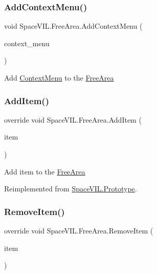 \subsubsection{\texorpdfstring{Add\+Context\+Menu()}{AddContextMenu()}}
{\footnotesize\ttfamily void Space\+V\+I\+L.\+Free\+Area.\+Add\+Context\+Menu (\begin{DoxyParamCaption}\item[{\mbox{\hyperlink{class_space_v_i_l_1_1_context_menu}{Context\+Menu}}}]{context\+\_\+menu }\end{DoxyParamCaption})}



Add \mbox{\hyperlink{class_space_v_i_l_1_1_context_menu}{Context\+Menu}} to the \mbox{\hyperlink{class_space_v_i_l_1_1_free_area}{Free\+Area}} 

\mbox{\label{class_space_v_i_l_1_1_free_area_a9145cbd1711d975fee90fde3187c1aff}} 
\subsubsection{\texorpdfstring{Add\+Item()}{AddItem()}}
{\footnotesize\ttfamily override void Space\+V\+I\+L.\+Free\+Area.\+Add\+Item (\begin{DoxyParamCaption}\item[{\mbox{\hyperlink{interface_space_v_i_l_1_1_core_1_1_i_base_item}{I\+Base\+Item}}}]{item }\end{DoxyParamCaption})\hspace{0.3cm}{\ttfamily [virtual]}}



Add item to the \mbox{\hyperlink{class_space_v_i_l_1_1_free_area}{Free\+Area}} 



Reimplemented from \mbox{\hyperlink{class_space_v_i_l_1_1_prototype}{Space\+V\+I\+L.\+Prototype}}.

\mbox{\label{class_space_v_i_l_1_1_free_area_ae9b39df00c0fa786b4072b8e49e3aacc}} 
\subsubsection{\texorpdfstring{Remove\+Item()}{RemoveItem()}}
{\footnotesize\ttfamily override void Space\+V\+I\+L.\+Free\+Area.\+Remove\+Item (\begin{DoxyParamCaption}\item[{\mbox{\hyperlink{interface_space_v_i_l_1_1_core_1_1_i_base_item}{I\+Base\+Item}}}]{item }\end{DoxyParamCaption})\hspace{0.3cm}{\ttfamily [virtual]}}



